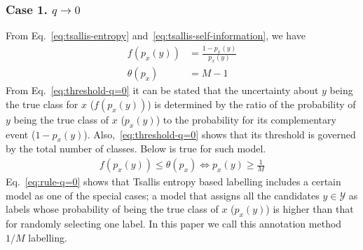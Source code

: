 \documentclass[a4paper,conference]{IEEEtran}
\begin{document}
\subsubsection{Case 1. $q \rightarrow 0$}
From Eq.~\eqref{eq:tsallis-entropy} and~\eqref{eq:tsallis-self-information}, we have
\begin{align}
    f(p_{x}(y)) &= \frac{1-p_{x}(y)}{p_{x}(y)}\label{eq:uncertainty-q=0}\\
    \theta(p_{x}) &= M -1\label{eq:threshold-q=0}
\end{align}
From Eq.~\eqref{eq:threshold-q=0} it can be stated that the uncertainty about $y$ being the true class for $x$ ($f(p_{x}(y))$) is determined by the ratio of the probability of $y$ being the true class of $x$ ($p_{x}(y)$) to the probability for its complementary event ($1-p_{x}(y)$).
Also,~\eqref{eq:threshold-q=0} shows that its threshold is governed by the total number of classes. 
Below is true for such model.
\begin{align}
    f(p_{x}(y)) \le \theta(p_{x}) \Leftrightarrow p_{x}(y) \ge \frac{1}{M}\label{eq:rule-q=0}
\end{align}
Eq.~\eqref{eq:rule-q=0} shows that Tsallis entropy based labelling includes a certain model as one of the special cases; a model that assigns all the candidates $y \in \mathcal{Y}$ as labels whose probability of being the true class of $x$ ($p_{x}(y)$) is higher than that for randomly selecting one label.
In this paper we call this annotation method $1/M$ labelling.

\end{document}

